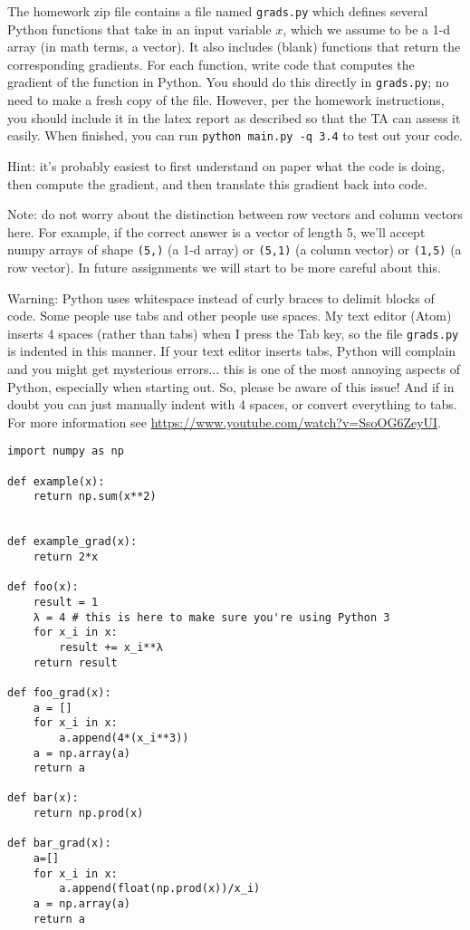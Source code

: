 \documentclass{article}
\def\blu#1{{\color{blu}#1}}
\begin{document}
The homework zip file contains a file named \texttt{grads.py} which defines several Python functions that take in an input variable $x$, which we assume to be a 1-d array (in math terms, a vector).
It also includes (blank) functions that return the corresponding gradients.
For each function, \blu{write code that computes the gradient of the function} in Python.
You should do this directly in \texttt{grads.py}; no need to make a fresh copy of the file. However, per the homework instructions, you should include it in the latex report as described so that the TA can assess it easily. When finished, you can run \texttt{python main.py -q 3.4} to test out your code. 

Hint: it's probably easiest to first understand on paper what the code is doing, then compute
the gradient, and then translate this gradient back into code.

Note: do not worry about the distinction between row vectors and column vectors here.
For example, if the correct answer is a vector of length 5, we'll accept numpy arrays
of shape \texttt{(5,)} (a 1-d array) or \texttt{(5,1)} (a column vector) or
\texttt{(1,5)} (a row vector). In future assignments we will start to be more careful
about this.

Warning: Python uses whitespace instead of curly braces to delimit blocks of code.
Some people use tabs and other people use spaces. My text editor (Atom) inserts 4 spaces (rather than tabs) when
I press the Tab key, so the file \texttt{grads.py} is indented in this manner. If your text editor inserts tabs,
Python will complain and you might get mysterious errors... this is one of the most annoying aspects
of Python, especially when starting out. So, please be aware of this issue! And if in doubt you can just manually
indent with 4 spaces, or convert everything to tabs. For more information
see \url{https://www.youtube.com/watch?v=SsoOG6ZeyUI}.

\begin{lstlisting}
import numpy as np

def example(x):
    return np.sum(x**2)


def example_grad(x):
    return 2*x

def foo(x):
    result = 1
    λ = 4 # this is here to make sure you're using Python 3
    for x_i in x:
        result += x_i**λ
    return result

def foo_grad(x):
    a = []
    for x_i in x:
        a.append(4*(x_i**3))
    a = np.array(a)
    return a

def bar(x):
    return np.prod(x)

def bar_grad(x):
    a=[]
    for x_i in x:
        a.append(float(np.prod(x))/x_i)
    a = np.array(a)
    return a
\end{lstlisting}
\end{document}
